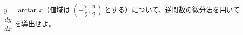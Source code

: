 
$y = \arctan x$（値域は $\left(-\dfrac{\pi}{2}, \dfrac{\pi}{2}\right)$ とする）について、逆関数の微分法を用いて $\dfrac{dy}{dx}$ を導出せよ。

